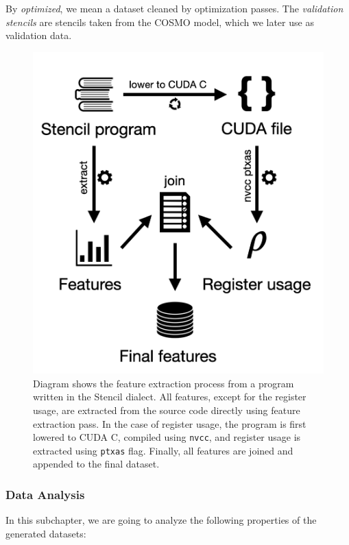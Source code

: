 \documentclass[sigplan,\review anonymous]{acmart}
\begin{document}
\noindent By \textit{optimized}, we mean a dataset cleaned by
optimization passes. The \textit{validation stencils} are stencils taken
from the COSMO model, which we later use as validation data.

\begin{figure}
  \centering
  \includegraphics[width=\columnwidth]{images/feat_coll_diagram.png}
  \caption{ Diagram shows the feature extraction process from a program
  written in the Stencil dialect. All features, except for the register
  usage, are extracted from the source code directly using feature extraction
  pass. In the case of register usage, the program is first lowered to CUDA C,
  compiled using \texttt{nvcc}, and register usage is extracted using
  \texttt{ptxas} flag. Finally, all features are joined and appended to the
  final dataset.}
  \label{fig:feat_coll_diagram}
\end{figure}

\subsubsection{Data Analysis}

In this subchapter, we are going to analyze the following properties
of the generated datasets:
\end{document}
